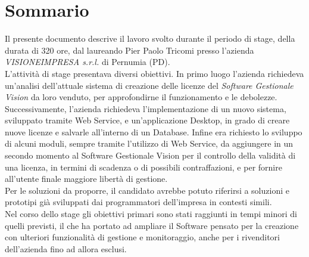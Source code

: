 
\cleardoublepage
{}
{}
\begingroup
\let\clearpage\relax
\let\cleardoublepage\relax
\let\cleardoublepage\relax

\chapter*{Sommario}

Il presente documento descrive il lavoro svolto durante il periodo di stage, della durata di 320 ore, dal laureando Pier Paolo Tricomi presso l'azienda \textit{VISIONEIMPRESA s.r.l.} di Pernumia (PD).
\\
L'attività di stage presentava diversi obiettivi. In primo luogo l'azienda richiedeva un'analisi dell'attuale sistema di creazione delle licenze del \textit{Software Gestionale Vision} da loro venduto, per approfondirne il funzionamento e le debolezze. Successivamente, l'azienda richiedeva l'implementazione di un nuovo sistema, sviluppato tramite Web Service, e un'applicazione Desktop, in grado di creare nuove licenze e salvarle all'interno di un Database. Infine era richiesto lo sviluppo di alcuni moduli, sempre tramite l'utilizzo di Web Service, da aggiungere in un secondo momento al Software Gestionale Vision per il controllo della validità di una licenza, in termini di scadenza o di possibili contraffazioni, e per fornire all'utente finale maggiore libertà di gestione.\\
Per le soluzioni da proporre, il candidato avrebbe potuto riferirsi a soluzioni e prototipi già sviluppati dai programmatori dell'impresa in contesti simili.
\\Nel corso dello stage gli obiettivi primari sono stati raggiunti in tempi minori di quelli previsti, il che ha portato ad ampliare il Software pensato per la creazione con ulteriori funzionalità di gestione e monitoraggio, anche per i rivenditori dell'azienda fino ad allora esclusi.
%
%

\endgroup			

\vfill

